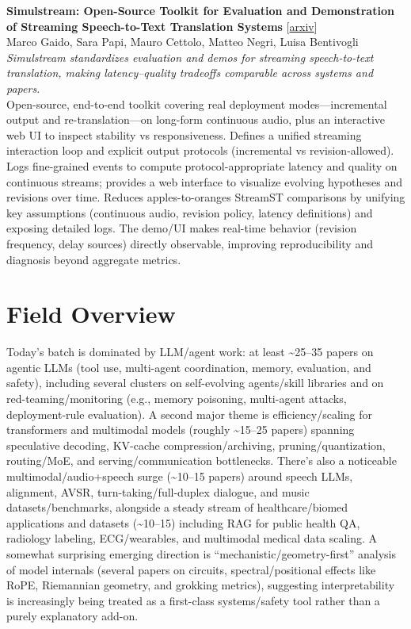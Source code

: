 \documentclass[12pt,letterpaper]{article}
\begin{document}
\medskip

{\small\textbf{Simulstream: Open-Source Toolkit for Evaluation and Demonstration of Streaming Speech-to-Text Translation Systems}} {\scriptsize[\href{https://arxiv.org/abs/2512.17648}{arxiv}]}\\
{\scriptsize Marco Gaido, Sara Papi, Mauro Cettolo, Matteo Negri, Luisa Bentivogli}\\

{\small\textit{Simulstream standardizes evaluation and demos for streaming speech-to-text translation, making latency--quality tradeoffs comparable across systems and papers.}}\\[1pt]
{\footnotesize Open-source, end-to-end toolkit covering real deployment modes---incremental output and re-translation---on long-form continuous audio, plus an interactive web UI to inspect stability vs responsiveness. Defines a unified streaming interaction loop and explicit output protocols (incremental vs revision-allowed). Logs fine-grained events to compute protocol-appropriate latency and quality on continuous streams; provides a web interface to visualize evolving hypotheses and revisions over time. Reduces apples-to-oranges StreamST comparisons by unifying key assumptions (continuous audio, revision policy, latency definitions) and exposing detailed logs. The demo/UI makes real-time behavior (revision frequency, delay sources) directly observable, improving reproducibility and diagnosis beyond aggregate metrics.}

\medskip



\section*{Field Overview}
{\footnotesize Today's batch is dominated by LLM/agent work: at least \textasciitilde{}25--35 papers on agentic LLMs (tool use, multi-agent coordination, memory, evaluation, and safety), including several clusters on self-evolving agents/skill libraries and on red-teaming/monitoring (e.g., memory poisoning, multi-agent attacks, deployment-rule evaluation). A second major theme is efficiency/scaling for transformers and multimodal models (roughly \textasciitilde{}15--25 papers) spanning speculative decoding, KV-cache compression/archiving, pruning/quantization, routing/MoE, and serving/communication bottlenecks. There's also a noticeable multimodal/audio+speech surge (\textasciitilde{}10--15 papers) around speech LLMs, alignment, AVSR, turn-taking/full-duplex dialogue, and music datasets/benchmarks, alongside a steady stream of healthcare/biomed applications and datasets (\textasciitilde{}10--15) including RAG for public health QA, radiology labeling, ECG/wearables, and multimodal medical data scaling. A somewhat surprising emerging direction is ``mechanistic/geometry-first'' analysis of model internals (several papers on circuits, spectral/positional effects like RoPE, Riemannian geometry, and grokking metrics), suggesting interpretability is increasingly being treated as a first-class systems/safety tool rather than a purely explanatory add-on.}
\end{document}
